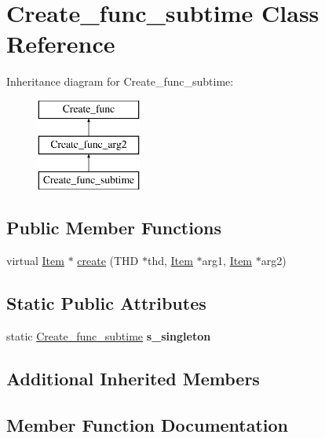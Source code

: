 \hypertarget{classCreate__func__subtime}{}\section{Create\+\_\+func\+\_\+subtime Class Reference}
\label{classCreate__func__subtime}
Inheritance diagram for Create\+\_\+func\+\_\+subtime\+:\begin{figure}[H]
\begin{center}
\leavevmode
\includegraphics[height=3.000000cm]{classCreate__func__subtime}
\end{center}
\end{figure}
\subsection*{Public Member Functions}
\begin{DoxyCompactItemize}
\item 
virtual \mbox{\hyperlink{classItem}{Item}} $\ast$ \mbox{\hyperlink{classCreate__func__subtime_a765f63f759190e74a9815fe7eb96b2d2}{create}} (T\+HD $\ast$thd, \mbox{\hyperlink{classItem}{Item}} $\ast$arg1, \mbox{\hyperlink{classItem}{Item}} $\ast$arg2)
\end{DoxyCompactItemize}
\subsection*{Static Public Attributes}
\begin{DoxyCompactItemize}
\item 
\mbox{\label{classCreate__func__subtime_a2fbb2ae691295fdafaa61b1c9485754e}} 
static \mbox{\hyperlink{classCreate__func__subtime}{Create\+\_\+func\+\_\+subtime}} {\bfseries s\+\_\+singleton}
\end{DoxyCompactItemize}
\subsection*{Additional Inherited Members}


\subsection{Member Function Documentation}
\mbox{\label{classCreate__func__subtime_a765f63f759190e74a9815fe7eb96b2d2}} 
